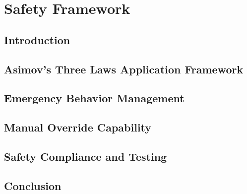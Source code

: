 \chapter{Safety Framework }

\section{Introduction}

\section{Asimov's Three Laws Application Framework}

\section{Emergency Behavior Management }

\section{Manual Override Capability }

\section{Safety Compliance and Testing}

\section{Conclusion}
